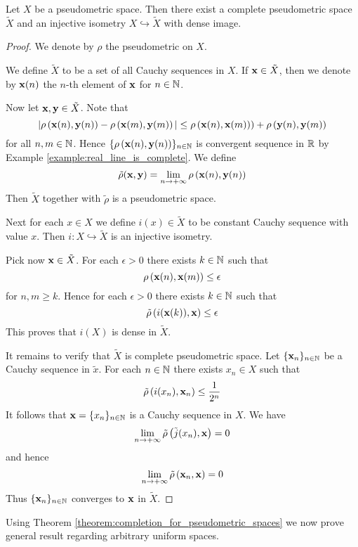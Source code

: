 \begin{theorem}\label{theorem:completion_for_pseudometric_spaces}
	Let $X$ be a pseudometric space. Then there exist a complete pseudometric space $\tilde{X}$ and an injective isometry $X \hookrightarrow \tilde{X}$ with dense image.
\end{theorem}
\begin{proof}
	We denote by $\rho$ the pseudometric on $X$.

	We define $\tilde{X}$ to be a set of all Cauchy sequences in $X$. If $\mathbf{x} \in \tilde{X}$, then we denote by $\mathbf{x}(n)$ the $n$-th element of $\mathbf{x}$ for $n \in {\mathbb N}$.

	Now let $\mathbf{x}, \mathbf{y} \in \tilde{X}$. Note that
	$$|\rho\left(\mathbf{x}(n),\mathbf{y}(n)\right) - \rho\left(\mathbf{x}(m),\mathbf{y}(m)\right)| \leq \rho\left(\mathbf{x}(n),\mathbf{x}(m)\right)) + \rho\left(\mathbf{y}(n),\mathbf{y}(m)\right)$$
	for all $n,m \in {\mathbb N}$. Hence $\{\rho\left(\mathbf{x}(n),\mathbf{y}(n)\right)\}_{n \in {\mathbb N}}$ is convergent sequence in ${\mathbb R}$ by Example \ref{example:real_line_is_complete}. We define
	$$\tilde{\rho}(\mathbf{x},\mathbf{y}) = \lim_{n\rightarrow +\infty}\rho\left(\mathbf{x}(n),\mathbf{y}(n)\right)$$
	Then $\tilde{X}$ together with $\tilde{\rho}$ is a pseudometric space.

	Next for each $x \in X$ we define $i(x) \in \tilde{X}$ to be constant Cauchy sequence with value $x$. Then $i:X \hookrightarrow \tilde{X}$ is an injective isometry.

	Pick now $\mathbf{x} \in \tilde{X}$. For each $\epsilon > 0$ there exists $k \in {\mathbb N}$ such that
	$$\rho\left(\mathbf{x}(n), \mathbf{x}(m)\right) \leq \epsilon$$
	for $n,m \geq k$. Hence for each $\epsilon > 0$ there exists $k \in {\mathbb N}$ such that
	$$\tilde{\rho}\left(i(\mathbf{x}(k)), \mathbf{x}\right) \leq \epsilon$$
	This proves that $i(X)$ is dense in $\tilde{X}$.

	It remains to verify that $\tilde{X}$ is complete pseudometric space. Let $\{\mathbf{x}_n\}_{n \in {\mathbb N}}$ be a Cauchy sequence in $\tilde{x}$. For each $n \in {\mathbb N}$ there exists $x_n \in X$ such that
	$$\tilde{\rho}\left(i(x_n), \mathbf{x}_n\right) \leq \frac{1}{2^n}$$
	It follows that $\mathbf{x} = \{x_n\}_{n \in {\mathbb N}}$ is a Cauchy sequence in $X$. We have
	$$\lim_{n\rightarrow +\infty}\tilde{\rho}\left(\tilde{j}(x_n),\mathbf{x}\right) = 0$$
	and hence
	$$\lim_{n\rightarrow +\infty}\tilde{\rho}\left(\mathbf{x}_n,\mathbf{x}\right) = 0$$
	Thus $\{\mathbf{x}_n\}_{n \in {\mathbb N}}$ converges to $\mathbf{x}$ in $\tilde{X}$.
\end{proof}
\noindent
Using Theorem \ref{theorem:completion_for_pseudometric_spaces} we now prove general result regarding arbitrary uniform spaces.

